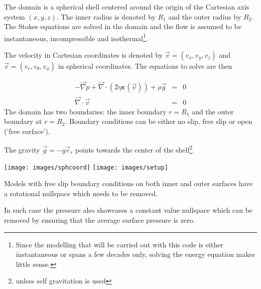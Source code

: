 

The domain is a spherical shell centered around the origin of the Cartesian 
axis system $(x,y,z)$. 
The inner radius is denoted by $R_1$ and the outer radius by $R_2$.
The Stokes equations are solved in the domain and the flow is assumed 
to be instantaneous, incompressible and isothermal\footnote{Since 
the modelling that will be carried out with this code is either 
instantaneous or spans a few decades only, solving the energy equation 
makes little sense.}.

The velocity in Cartesian coordinates is denoted by $\vec{v}=(v_x,v_y,v_z)$ and 
$\vec{v}=(v_r,v_\theta,v_\phi)$ in spherical coordinates. 
The equations to solve are then

\begin{eqnarray}
- \vec\nabla p + \vec\nabla \cdot (2 \eta {\bm \varepsilon}(\vec v))  + \rho \vec{g} &=& 0 \\
\vec\nabla \cdot \vec{v} &=& 0
\end{eqnarray}
The domain has two boundaries: the inner boundary $r=R_1$ and the outer boundary at $r=R_2$.
Boundary conditions can be either no slip, free slip or open ('free surface').



The gravity $\vec{g}=-g \vec{e}_r$ points towards the center of the 
shell\footnote{unless self gravitation is used}.

\begin{center}
\texttt{[image: images/sphcoord]}
\texttt{[image: images/setup]}
\end{center}

Models with free slip boundary conditions on both inner and outer surfaces have a rotational nullspace which needs to be removed. 

In such case the pressure also showcases a constant value nullspace which can be removed by ensuring that the average surface pressure is zero.
